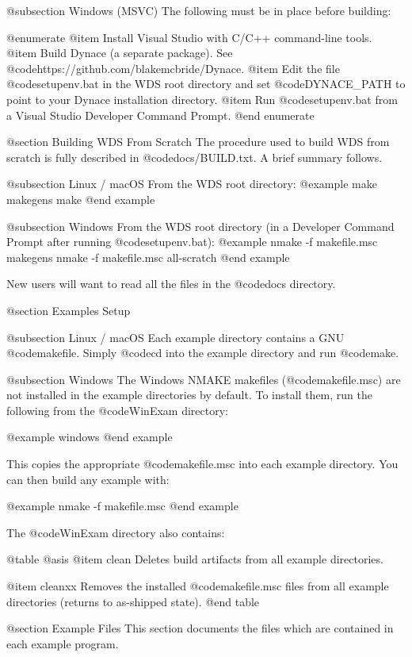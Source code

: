 @subsection Windows (MSVC)
The following must be in place before building:

@enumerate
@item
Install Visual Studio with C/C++ command-line tools.
@item
Build Dynace (a separate package).
See @code{https://github.com/blakemcbride/Dynace}.
@item
Edit the file @code{setupenv.bat} in the WDS root directory and set
@code{DYNACE_PATH} to point to your Dynace installation directory.
@item
Run @code{setupenv.bat} from a Visual Studio Developer Command Prompt.
@end enumerate


@section Building WDS From Scratch
The procedure used to build WDS from scratch is fully described
in @code{docs/BUILD.txt}.  A brief summary follows.

@subsection Linux / macOS
From the WDS root directory:
@example
make makegens
make
@end example

@subsection Windows
From the WDS root directory (in a Developer Command Prompt after
running @code{setupenv.bat}):
@example
nmake -f makefile.msc makegens
nmake -f makefile.msc all-scratch
@end example

New users will want to read all the files in the @code{docs} directory.


@section Examples Setup

@subsection Linux / macOS
Each example directory contains a GNU @code{makefile}.  Simply
@code{cd} into the example directory and run @code{make}.

@subsection Windows
The Windows NMAKE makefiles (@code{makefile.msc}) are not installed in
the example directories by default.  To install them, run the following
from the @code{WinExam\setup} directory:

@example
windows
@end example

This copies the appropriate @code{makefile.msc} into each example
directory.  You can then build any example with:

@example
nmake -f makefile.msc
@end example

The @code{WinExam\setup} directory also contains:

@table @asis
@item clean
Deletes build artifacts from all example directories.

@item cleanxx
Removes the installed @code{makefile.msc} files from all example
directories (returns to as-shipped state).
@end table




@section Example Files
This section documents the files which are contained in each example
program.

